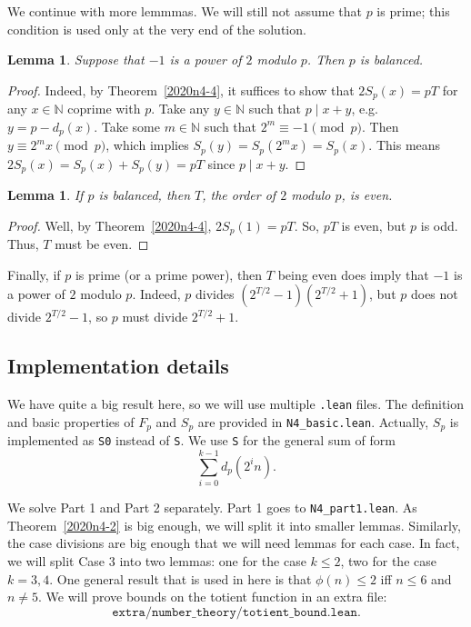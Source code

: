 \documentclass{article}
\newtheorem{lemma}[theorem]{Lemma}
\newcommand{\N}{\mathbb{N}}
\begin{document}
We continue with more lemmmas.
We will still not assume that $p$ is prime; this condition is used only at the very end of the solution.

\begin{lemma}\label{2020n4-5}
Suppose that $-1$ is a power of $2$ modulo $p$.
Then $p$ is balanced.
\end{lemma}
\begin{proof}
Indeed, by Theorem~\ref{2020n4-4}, it suffices to show that $2 S_p(x) = pT$ for any $x \in \N$ coprime with $p$.
Take any $y \in \N$ such that $p \mid x + y$, e.g. $y = p - d_p(x)$.
Take some $m \in \N$ such that $2^m \equiv -1 \pmod{p}$.
Then $y \equiv 2^m x \pmod{p}$, which implies $S_p(y) = S_p(2^m x) = S_p(x)$.
This means $2 S_p(x) = S_p(x) + S_p(y) = pT$ since $p \mid x + y$.
\end{proof}

\begin{lemma}\label{2020n4-6}
If $p$ is balanced, then $T$, the order of $2$ modulo $p$, is even.
\end{lemma}
\begin{proof}
Well, by Theorem~\ref{2020n4-4}, $2 S_p(1) = pT$.
So, $pT$ is even, but $p$ is odd.
Thus, $T$ must be even.
\end{proof}

Finally, if $p$ is prime (or a prime power), then $T$ being even does imply that $-1$ is a power of $2$ modulo $p$.
Indeed, $p$ divides $(2^{T/2} - 1)(2^{T/2} + 1)$, but $p$ does not divide $2^{T/2} - 1$, so $p$ must divide $2^{T/2} + 1$.



\subsection*{Implementation details}

We have quite a big result here, so we will use multiple \texttt{.lean} files.
The definition and basic properties of $F_p$ and $S_p$ are provided in \texttt{N4\_basic.lean}.
Actually, $S_p$ is implemented as \texttt{S0} instead of \texttt{S}.
We use \texttt{S} for the general sum of form
\[ \sum_{i = 0}^{k - 1} d_p(2^i n). \]

We solve Part 1 and Part 2 separately.
Part 1 goes to \texttt{N4\_part1.lean}.
As Theorem~\ref{2020n4-2} is big enough, we will split it into smaller lemmas.
Similarly, the case divisions are big enough that we will need lemmas for each case.
In fact, we will split Case 3 into two lemmas: one for the case $k \leq 2$, two for the case $k = 3, 4$.
One general result that is used in here is that $\phi(n) \leq 2$ iff $n \leq 6$ and $n \neq 5$.
We will prove bounds on the totient function in an extra file:
\[ \texttt{extra/number\_theory/totient\_bound.lean}. \]
\end{document}
